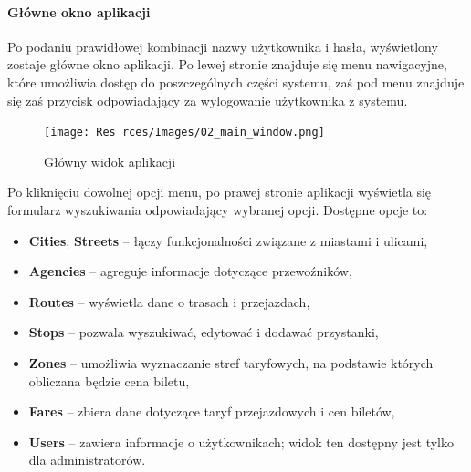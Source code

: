 \documentclass[10pt,a4paper]{article}
\begin{document}
\paragraph{Główne okno aplikacji}
Po podaniu prawidłowej kombinacji nazwy użytkownika i hasła, wyświetlony zostaje główne okno aplikacji. Po lewej stronie znajduje się menu nawigacyjne, które umożliwia dostęp do poszczególnych części systemu, zaś pod menu znajduje się zaś przycisk odpowiadający za wylogowanie użytkownika z systemu.
\begin{figure}[H]
	\centering
	\texttt{[image: Res	rces/Images/02\_main\_window.png]}
	\caption{Główny widok aplikacji}
\end{figure}
Po kliknięciu dowolnej opcji menu, po prawej stronie aplikacji wyświetla się formularz wyszukiwania odpowiadający wybranej opcji. Dostępne opcje to:
\begin{itemize}
	\item \textbf{Cities}, \textbf{Streets} -- łączy funkcjonalności związane z miastami i ulicami,
	\item \textbf{Agencies} -- agreguje informacje dotyczące przewoźników,
	\item \textbf{Routes} -- wyświetla dane o trasach i przejazdach,
	\item \textbf{Stops} -- pozwala wyszukiwać, edytować i dodawać przystanki,
	\item \textbf{Zones} -- umożliwia wyznaczanie stref taryfowych, na podstawie których obliczana będzie cena biletu,
	\item \textbf{Fares} -- zbiera dane dotyczące taryf przejazdowych i cen biletów,
	\item \textbf{Users} -- zawiera informacje o użytkownikach; widok ten dostępny jest tylko dla administratorów.
\end{itemize}
\end{document}
